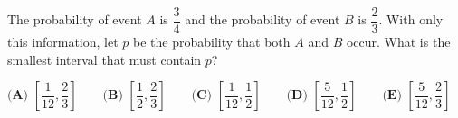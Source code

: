The probability of event $A$ is $\dfrac34$ and the probability of event $B$ is $\dfrac23$. With only this information, let $p$ be the probability that both $A$ and $B$ occur. What is the smallest interval that must contain $p$?

$\textbf{(A) }\left[\dfrac{1}{12},\dfrac23\right]\qquad\textbf{(B) }\left[\dfrac12,\dfrac23\right]\qquad\textbf{(C) }\left[\dfrac{1}{12},\dfrac12\right]\qquad\textbf{(D) }\left[\dfrac{5}{12},\dfrac12\right]\qquad\textbf{(E) }\left[\dfrac{5}{12},\dfrac23\right]$
